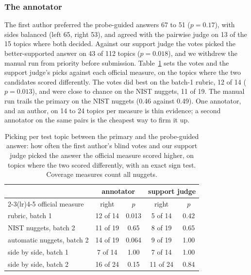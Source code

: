 \documentclass[sigconf,nonacm]{acmart}
\begin{document}
\subsubsection{The annotator}
The first author preferred the probe-guided answers 67 to 51 ($p = 0.17$), with sides
balanced (left 65, right 53), and agreed with the pairwise judge on 13 of the 15
topics where both decided. Against our support judge the votes picked the
better-supported answer on 43 of 112 topics ($p = 0.018$), and we withdrew the manual
run from priority before submission. Table~\ref{tab:annotator} sets the votes and the
support judge's picks against each official measure, on the topics where the two
candidates scored differently. The votes did best on the batch-1 rubric, 12 of 14
($p = 0.013$), and were close to chance on the NIST nuggets, 11 of 19. The manual run
trails the primary on the NIST nuggets (0.46 against 0.49). One annotator, and an
author, on 14 to 24 topics per measure is thin evidence; a second annotator on the
same pairs is the cheapest way to firm it up.

\begin{table}[t]
\caption{Picking per test topic between the primary and the probe-guided answer: how
often the first author's blind votes and our support judge picked the answer the
official measure scored higher, on topics where the two scored differently, with an
exact sign test. Coverage measures count all nuggets.}
\label{tab:annotator}
\small
\setlength{\tabcolsep}{3pt}
\begin{tabular}{lcccc}
\toprule
 & \multicolumn{2}{c}{annotator} & \multicolumn{2}{c}{support judge} \\
\cmidrule(lr){2-3}\cmidrule(lr){4-5}
official measure & right & $p$ & right & $p$ \\
\midrule
rubric, batch 1 & 12 of 14 & 0.013 & 5 of 14 & 0.42 \\
NIST nuggets, batch 2 & 11 of 19 & 0.65 & 8 of 19 & 0.65 \\
automatic nuggets, batch 2 & 14 of 19 & 0.064 & 9 of 19 & 1.00 \\
side by side, batch 1 & 7 of 14 & 1.00 & 7 of 14 & 1.00 \\
side by side, batch 2 & 16 of 24 & 0.15 & 11 of 24 & 0.84 \\
\bottomrule
\end{tabular}
\end{table}
\end{document}
